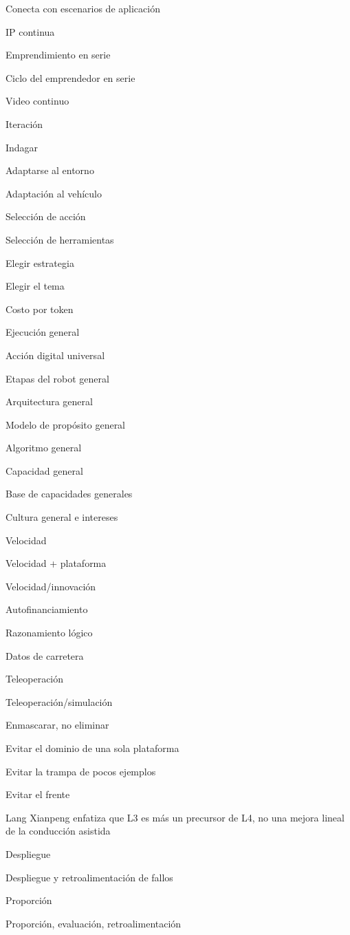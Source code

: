 \documentclass{article}
\begin{document}
Conecta con escenarios de aplicación

IP continua

Emprendimiento en serie

Ciclo del emprendedor en serie

Video continuo

Iteración

Indagar

Adaptarse al entorno

Adaptación al vehículo

Selección de acción

Selección de herramientas

Elegir estrategia

Elegir el tema

Costo por token

Ejecución general

Acción digital universal

Etapas del robot general

Arquitectura general

Modelo de propósito general

Algoritmo general

Capacidad general

Base de capacidades generales

Cultura general e intereses

Velocidad

Velocidad + plataforma

Velocidad/innovación

Autofinanciamiento

Razonamiento lógico

Datos de carretera

Teleoperación

Teleoperación/simulación

Enmascarar, no eliminar

Evitar el dominio de una sola plataforma

Evitar la trampa de pocos ejemplos

Evitar el frente

Lang Xianpeng enfatiza que L3 es más un precursor de L4, no una mejora lineal de la conducción asistida

Despliegue

Despliegue y retroalimentación de fallos

Proporción

Proporción, evaluación, retroalimentación
\end{document}
